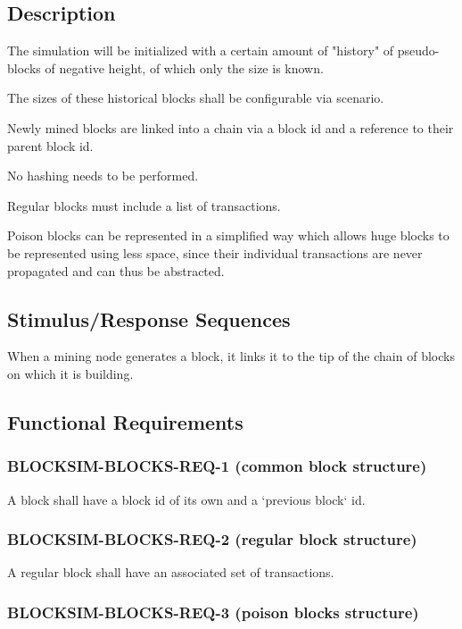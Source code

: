 \documentclass{scrreprt}
\begin{document}
\subsection{Description}

The simulation will be initialized with a certain amount of "history" of
pseudo-blocks of negative height, of which only the size is known.

The sizes of these historical blocks shall be configurable via scenario.

Newly mined blocks are linked into a chain via a block id and a reference
to their parent block id.

No hashing needs to be performed.

Regular blocks must include a list of transactions.

Poison blocks can be represented in a simplified way which allows huge
blocks to be represented using less space, since their individual
transactions are never propagated and can thus be abstracted.


\subsection{Stimulus/Response Sequences}

When a mining node generates a block, it links it to the tip of the chain
of blocks on which it is building.


\subsection{Functional Requirements}

\subsubsection{BLOCKSIM-BLOCKS-REQ-1 (common block structure)}

A block shall have a block id of its own and a `previous block` id.


\subsubsection{BLOCKSIM-BLOCKS-REQ-2 (regular block structure)}

A regular block shall have an associated set of transactions.


\subsubsection{BLOCKSIM-BLOCKS-REQ-3 (poison blocks structure)}
\end{document}
